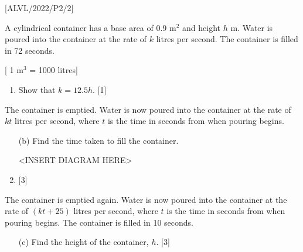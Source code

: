 \item {[}ALVL/2022/P2/2{]}

A cylindrical container has a base area of 0.9 $\mathrm{m}^{2}$ and
height $h$ m. Water is poured into the container at the rate of $k$
litres per second. The container is filled in 72 seconds.

{[} 1 $\mathrm{m}^{3}$ = 1000 litres{]}
\begin{enumerate}
\item Show that $k=12.5h$.\hfill{} {[}1{]}
\end{enumerate}
The container is emptied. Water is now poured into the container at
the rate of $kt$ litres per second, where $t$ is the time in seconds
from when pouring begins. 
\begin{enumerate}
\item[(b)]  Find the time taken to fill the container.
\noindent \begin{center}
<INSERT DIAGRAM HERE>
\par\end{center}
\item \hfill{} {[}3{]}
\end{enumerate}
The container is emptied again. Water is now poured into the container
at the rate of $\left(kt+25\right)$ litres per second, where $t$
is the time in seconds from when pouring begins. The container is
filled in 10 seconds.
\begin{enumerate}
\item[(c)]  Find the height of the container, $h$. \hfill{}{[}3{]}
\end{enumerate}
